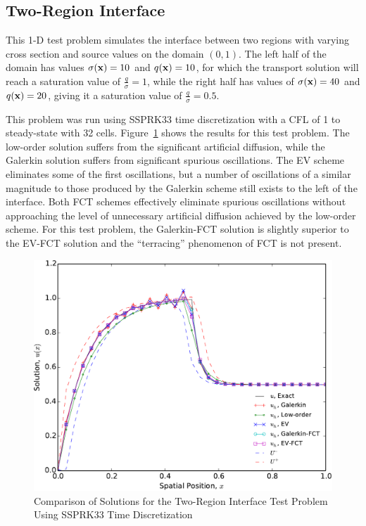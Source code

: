 \clearpage
\subsection{Two-Region Interface}
This 1-D test problem simulates the interface between two regions with
varying cross section and source values on the domain $(0,1)$.
The left half of the domain has values $\sigma(\mathbf{x})=10$ and $q(\mathbf{x})=10$, for which the transport
solution will reach a
saturation value of $\frac{q}{\sigma}=1$, while the right half has values
of $\sigma(\mathbf{x})=40$ and $q(\mathbf{x})=20$, giving it a saturation value of
$\frac{q}{\sigma}=0.5$.

This problem was run using SSPRK33 time discretization with a CFL of 1 to
steady-state with 32 cells. Figure~\ref{fig:interface} shows the results
for this test problem. The low-order solution suffers from the significant
artificial diffusion, while the Galerkin solution suffers from significant
spurious oscillations. The EV scheme eliminates some of the first oscillations,
but a number of oscillations of a similar magnitude to those produced by
the Galerkin scheme still exists to the left of the interface. Both FCT
schemes effectively eliminate spurious oscillations without approaching
the level of unnecessary artificial diffusion achieved by the low-order
scheme. For this test problem, the Galerkin-FCT solution is slightly
superior to the EV-FCT solution and the ``terracing'' phenomenon
of FCT is not present.

\begin{figure}[htb]
   \centering
      \includegraphics[width=\textwidth]
        {images/solution_interface.pdf}
      \caption{Comparison of Solutions for the Two-Region Interface Test
       Problem Using SSPRK33 Time Discretization}
   \label{fig:interface}
\end{figure}
\clearpage
